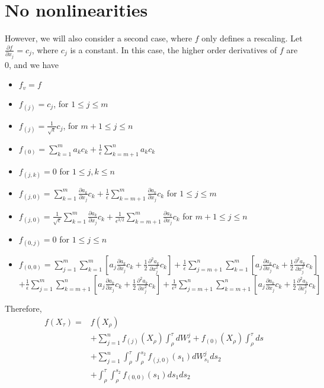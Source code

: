 \documentclass[12pt]{article}
\begin{document}
\section{No nonlinearities}

However, we will also consider a second case, where $f$ only defines a rescaling.
%
Let $\frac{\partial f}{\partial x_j} = c_j$, where $c_j$ is a constant.
%
In this case, the higher order derivatives of $f$ are 0, and we have
%
\begin{itemize}
\item $f_v = f$
%
\item $f_{(j)} = c_j$, for $1 \le j \le m$
\item $f_{(j)} = \frac{1}{\sqrt{\epsilon}} c_j$, for $m+1 \le j \le n$
%
\item $f_{(0)} = \sum_{k=1}^m a_k c_k
+ \frac{1}{\epsilon} \sum_{k=m+1}^n a_k c_k$
%
\item $f_{(j, k)} =  0  $ for $1 \le j,k \le n$
%
\item $f_{(j,0)} = \sum_{k=1}^m \frac{\partial a_k}{\partial x_j} c_k  + \frac{1}{\epsilon} \sum_{k=m+1}^m \frac{\partial a_k }{\partial x_j} c_k $ for $1 \le j \le m$
\item $f_{(j,0)} = \frac{1}{\sqrt{\epsilon}} \sum_{k=1}^m \frac{\partial a_k }{\partial x_j} c_k  + \frac{1}{\epsilon^{3/2}} \sum_{k=m+1}^m \frac{\partial a_k}{\partial x_j} c_k$ for $m+1 \le j \le n$
%
\item $f_{(0, j)} =0 $ for $1 \le j \le n$
%
\item $f_{(0,0)}  = \sum_{j=1}^m \sum_{k=1}^m \left[ a_j \frac{\partial a_k}{\partial x_j} c_k + \frac{1}{2} \frac{\partial^2 a_k}{\partial x_j^2} c_k \right] 
+ \frac{1}{\epsilon} \sum_{j=m+1}^n \sum_{k=1}^m \left[ a_j \frac{\partial a_k}{\partial x_j} c_k + \frac{1}{2} \frac{\partial^2 a_k}{\partial x_j^2} c_k \right] $\\
$+ \frac{1}{\epsilon} \sum_{j=1}^m \sum_{k= m+1}^n \left[ a_j \frac{\partial a_k}{\partial x_j} c_k + \frac{1}{2} \frac{\partial^2 a_k}{\partial x_j^2} c_k \right] 
+ \frac{1}{\epsilon^2} \sum_{j=m+1}^n \sum_{k=m+1}^n \left[ a_j \frac{\partial a_k}{\partial x_j} c_k + \frac{1}{2} \frac{\partial^2 a_k}{\partial x_j^2} c_k \right]  $
\end{itemize}


Therefore, 
\begin{equation} 
\begin{aligned}
f( X_\tau) =& f(X_\rho) \\
& + \sum_{j=1}^n f_{(j)} (X_\rho) \int_\rho^\tau dW_s^j 
  + f_{(0)} (X_\rho) \int_\rho^\tau ds \\
& + \sum_{j=1}^n \int_\rho^\tau \int_\rho^{s_2} f_{(j,0)} (s_1) dW_{s_1}^j ds_2 \\
& + \int_\rho^\tau \int_\rho^{s_2} f_{(0,0)} (s_1) ds_1 ds_2 
\end{aligned}
\end{equation}
\end{document}
